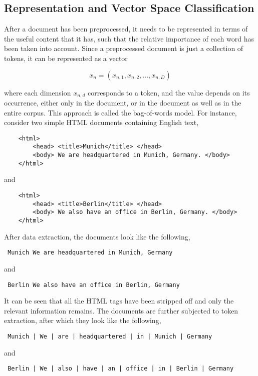 \subsection{Representation and Vector Space Classification}
After a document has been preprocessed, it needs to be represented in terms of the useful content that it has, such that the relative importance of each word has been taken into account. Since a preprocessed document is just a collection of tokens, it can be represented as a vector

$$x_n = (x_{n, 1}, x_{n, 2}, ... , x_{n, D})$$

where each dimension $x_{n, d}$ corresponds to a token, and the value depends on its occurrence, either only in the document, or in the document as well as in the entire corpus. This approach is called the bag-of-words model. For instance, consider two simple HTML documents containing English text,

\begin{center}
    \begin{verbatim}
    <html>
        <head> <title>Munich</title> </head>
        <body> We are headquartered in Munich, Germany. </body>
    </html>
    \end{verbatim}
    and
    \begin{verbatim}
    <html>
        <head> <title>Berlin</title> </head>
        <body> We also have an office in Berlin, Germany. </body>
    </html>
    \end{verbatim}
\end{center}

After data extraction, the documents look like the following,

\begin{center}
    \begin{verbatim} Munich We are headquartered in Munich, Germany \end{verbatim}
    and
    \begin{verbatim} Berlin We also have an office in Berlin, Germany \end{verbatim}
\end{center}

It can be seen that all the HTML tags have been stripped off and only the relevant information remains. The documents are further subjected to token extraction, after which they look like the following,

\begin{center}
    \begin{verbatim} Munich | We | are | headquartered | in | Munich | Germany \end{verbatim}
    and
    \begin{verbatim} Berlin | We | also | have | an | office | in | Berlin | Germany \end{verbatim}
\end{center}

